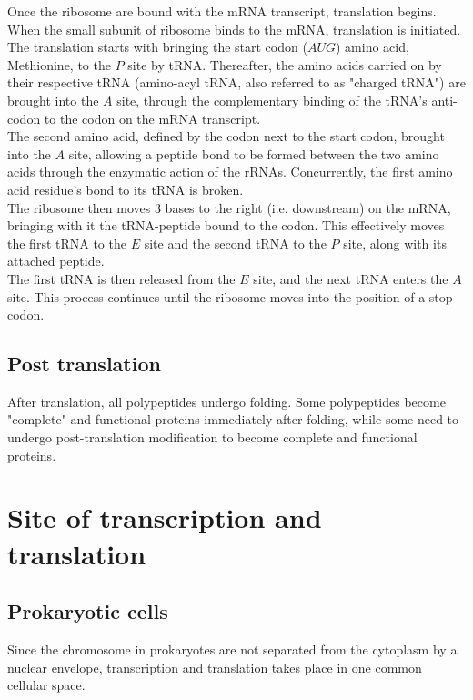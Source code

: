 \documentclass[11pt]{article}
\begin{document}
Once the ribosome are bound with the mRNA transcript, translation begins.
\\[0pt]

When the small subunit of ribosome binds to the mRNA, translation is initiated. The translation starts with bringing the start codon (\(AUG\)) amino acid, Methionine, to the \(P\) site by tRNA. Thereafter, the amino acids carried on by their respective tRNA (amino-acyl tRNA, also referred to as "charged tRNA") are brought into the \(A\) site, through the complementary binding of the tRNA's anti-codon to the codon on the mRNA transcript.
\\[0pt]

The second amino acid, defined by the codon next to the start codon, brought into the \(A\) site, allowing a peptide bond to be formed between the two amino acids through the enzymatic action of the rRNAs. Concurrently, the first amino acid residue's bond to its tRNA is broken.
\\[0pt]

The ribosome then moves 3 bases to the right (i.e. downstream) on the mRNA, bringing with it the tRNA-peptide bound to the codon. This effectively moves the first tRNA to the \(E\) site and the second tRNA to the \(P\) site, along with its attached peptide.
\\[0pt]

The first tRNA is then released from the \(E\) site, and the next tRNA enters the \(A\) site. This process continues until the ribosome moves into the position of a stop codon.

\subsection{Post translation}
\label{sec:org91cd2f7}
After translation, all polypeptides undergo folding. Some polypeptides become "complete" and functional proteins immediately after folding, while some need to undergo post-translation modification to become complete and functional proteins.


\section{Site of transcription and translation}
\label{sec:orgb2472a8}

\subsection{Prokaryotic cells}
\label{sec:org5c3d4fc}
Since the chromosome in prokaryotes are not separated from the cytoplasm by a nuclear envelope, transcription and translation takes place in one common cellular space.
\end{document}

